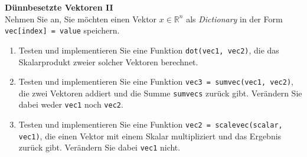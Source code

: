 \textbf{Dünnbesetzte Vektoren II}\\
Nehmen Sie an, Sie möchten einen Vektor $x \in \mathbb{R}^n$ als \textit{Dictionary} in der Form \verb|vec[index] = value| speichern.

\begin{enumerate}
	\item Testen und implementieren Sie eine Funktion \verb|dot(vec1, vec2)|, die das Skalarprodukt zweier solcher Vektoren berechnet.
	\item Testen und implementieren Sie eine Funktion \verb|vec3 = sumvec(vec1, vec2)|, die zwei Vektoren addiert und die Summe \verb|sumvecs| zurück gibt. Verändern Sie dabei weder \verb|vec1| noch \verb|vec2|.
	\item Testen und implementieren Sie eine Funktion \verb|vec2 = scalevec(scalar, vec1)|, die einen Vektor mit einem Skalar multipliziert und das Ergebnis zurück gibt. Verändern Sie dabei \verb|vec1| nicht.
\end{enumerate}